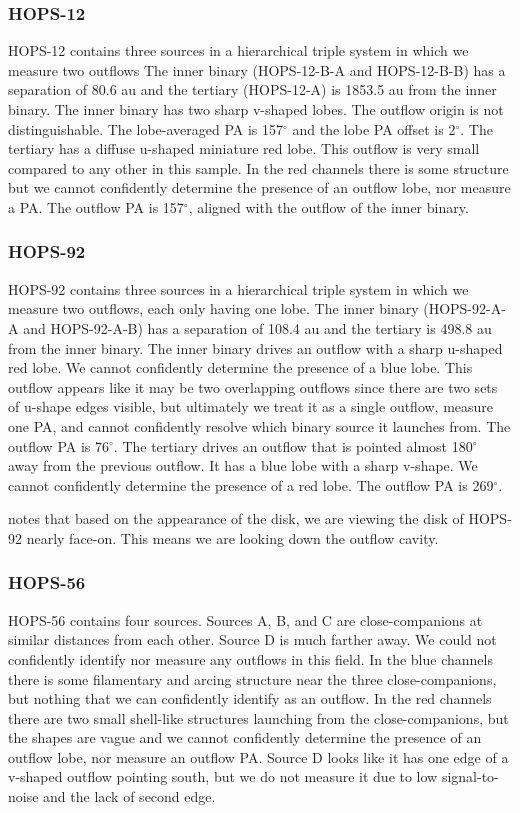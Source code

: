 \documentclass[linenumbers,twocolumn, twocolappendix]{aastex631}
\begin{document}
\subsubsection{HOPS-12}
HOPS-12 contains three sources in a hierarchical triple system in which we measure two outflows The inner binary (HOPS-12-B-A and HOPS-12-B-B) has a separation of 80.6 au and the tertiary (HOPS-12-A) is 1853.5 au from the inner binary. The inner binary has two sharp v-shaped lobes. The outflow origin is not distinguishable. The lobe-averaged PA is 157$^\circ$ and the lobe PA offset is 2$^\circ$. The tertiary has a diffuse u-shaped miniature red lobe. This outflow is very small compared to any other in this sample. In the red channels there is some structure but we cannot confidently determine the presence of an outflow lobe, nor measure a PA. The outflow PA is 157$^\circ$, aligned with the outflow of the inner binary.

\subsubsection{HOPS-92}
HOPS-92 contains three sources in a hierarchical triple system in which we measure two outflows, each only having one lobe. The inner binary (HOPS-92-A-A and HOPS-92-A-B) has a separation of 108.4 au and the tertiary is 498.8 au from the inner binary. The inner binary drives an outflow with a sharp u-shaped red lobe. We cannot confidently determine the presence of a blue lobe. This outflow appears like it may be two overlapping outflows since there are two sets of u-shape edges visible, but ultimately we treat it as a single outflow, measure one PA, and cannot confidently resolve which binary source it launches from. The outflow PA is 76$^\circ$. The tertiary drives an outflow that is pointed almost 180$^\circ$ away from the previous outflow. It has a blue lobe with a sharp v-shape. We cannot confidently determine the presence of a red lobe. The outflow PA is 269$^\circ$.

\cite{Federman_2023} notes that based on the appearance of the disk, we are viewing the disk of HOPS-92 nearly face-on. This means we are looking down the outflow cavity.

\subsubsection{HOPS-56}
HOPS-56 contains four sources. Sources A, B, and C are close-companions at similar distances from each other. Source D is much farther away. We could not confidently identify nor measure any outflows in this field. In the blue channels there is some filamentary and arcing structure near the three close-companions, but nothing that we can confidently identify as an outflow. In the red channels there are two small shell-like structures launching from the close-companions, but the shapes are vague and we cannot confidently determine the presence of an outflow lobe, nor measure an outflow PA. Source D looks like it has one edge of a v-shaped outflow pointing south, but we do not measure it due to low signal-to-noise and the lack of second edge.
\end{document}
